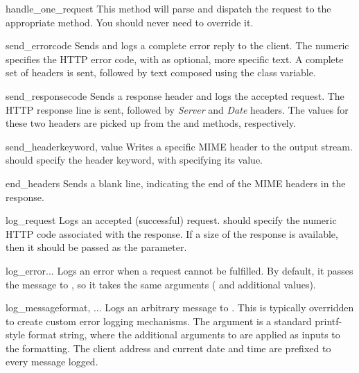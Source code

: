\begin{methoddesc}{handle_one_request}{}
This method will parse and dispatch
the request to the appropriate  method.  You should
never need to override it.
\end{methoddesc}

\begin{methoddesc}{send_error}{code}
Sends and logs a complete error reply to the client. The numeric
 specifies the HTTP error code, with  as
optional, more specific text. A complete set of headers is sent,
followed by text composed using the 
class variable.
\end{methoddesc}

\begin{methoddesc}{send_response}{code}
Sends a response header and logs the accepted request. The HTTP
response line is sent, followed by \emph{Server} and \emph{Date}
headers. The values for these two headers are picked up from the
 and  methods,
respectively.
\end{methoddesc}

\begin{methoddesc}{send_header}{keyword, value}
Writes a specific MIME header to the output stream. 
should specify the header keyword, with  specifying
its value.
\end{methoddesc}

\begin{methoddesc}{end_headers}{}
Sends a blank line, indicating the end of the MIME headers in
the response.
\end{methoddesc}

\begin{methoddesc}{log_request}{}
Logs an accepted (successful) request.  should specify
the numeric HTTP code associated with the response. If a size of
the response is available, then it should be passed as the
 parameter.
\end{methoddesc}

\begin{methoddesc}{log_error}{...}
Logs an error when a request cannot be fulfilled. By default,
it passes the message to , so it takes the
same arguments ( and additional values).
\end{methoddesc}

\begin{methoddesc}{log_message}{format, ...}
Logs an arbitrary message to . This is typically
overridden to create custom error logging mechanisms. The
 argument is a standard printf-style format string,
where the additional arguments to  are applied
as inputs to the formatting. The client address and current date
and time are prefixed to every message logged.
\end{methoddesc}

